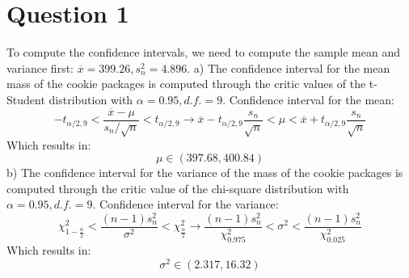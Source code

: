 \documentclass{article}
\date{November 2024}
\begin{document}

\section{Question 1}
To compute the confidence intervals, we need to compute the sample mean and variance first: \( \overline{x}=399.26, s_n^2=4.896\). 
a) The confidence interval for the mean mass of the cookie packages is computed through the critic values of the t-Student distribution with \(\alpha=0.95,d.f.=9\).
Confidence interval for the mean:\[
-t_{\alpha/2,9} < \frac{\overline{x}-\mu}{s_n/\sqrt{n}}<t_{\alpha/2,9} \rightarrow \overline{x}-t_{\alpha/2,9}\frac{s_n}{\sqrt{n}}<\mu<\overline{x}+t_{\alpha/2,9}\frac{s_n}{\sqrt{n}}
\]
Which results in:\[
\mu \in (397.68, 400.84)
\]
b) The confidence interval for the variance of the mass of the cookie packages is computed through the critic value of the chi-square distribution with \(\alpha=0.95,d.f.=9\).
Confidence interval for the variance:\[
\chi^2_{1-\frac{\alpha}{2}}<\frac{(n-1)s_n^2}{\sigma^2}<\chi^2_{\frac{\alpha}{2}} \rightarrow \frac{(n-1)s_n^2}{\chi^2_{0.975}}<\sigma^2<\frac{(n-1)s_n^2}{\chi^2_{0.025}}
\]
Which results in:\[
\sigma^2 \in (2.317, 16.32)
\]
\end{document}

